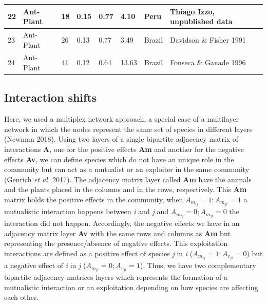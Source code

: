 \documentclass[a4paper, 12pt]{article}
\begin{document}
\begin{table}[H]
\begin{adjustbox}{width=\columnwidth,center}
{\begin{tabular}{|l|l|l|l|l|l|l|l|}
22                                 & Ant-Plant                          & 18                              & 0.15                            & 0.77                            & 4.10                               & Peru                                   & Thiago Izzo, unpublished data                   \\ \hline
23                                 & Ant-Plant                          & 26                              & 0.13                            & 0.77                            & 3.49                               & Brazil                                 & Davidson \& Fisher 1991                         \\ \hline
24                                 & Ant-Plant                          & 41                              & 0.12                            & 0.64                            & 13.63                              & Brazil                                 & Fonseca \& Ganade 1996                          \\ \hline
\end{tabular}}
\end{adjustbox}
\end{table}

\subsection*{Interaction shifts}
Here, we used a multiplex network approach, a special case of a multilayer network in which the nodes represent the same set of species in different layers (Newman 2018). Using two layers of a single bipartite adjacency matrix of interactions \textbf{A}, one for the positive effects \textbf{Am} and another for the negative effects \textbf{Av}, we can define species which do not have an unique role in the community but can act as a mutualist or an exploiter in the same community (Genrich \textit{et al.} 2017). The adjacency matrix layer called \textbf{Am} have the animals and the plants placed in the columns and in the rows, respectively. This \textbf{Am} matrix holds the positive effects in the community, when $A_{m_{ij}} = 1; A_{m_{ji}} = 1$ a mutualistic interaction happens between \textit{i} and \textit{j} and $A_{m_{ij}} = 0; A_{m_{ji}} = 0$ the interaction did not happen. Accordingly, the negative effects we have in an adjacency matrix layer \textbf{Av} with the same rows and columns as \textbf{Am} but representing the presence/absence of negative effects. This exploitation interactions are defined as a positive effect of species \textit{j} in \textit{i} ($A_{m_{ij}} = 1; A_{v_{ji}} = 0$) but a negative effect of \textit{i} in \textit{j}  ($A_{m_{ji}} = 0; A_{v_{ji}} = 1$). Thus, we have two complementary bipartite adjacency matrices layers which represents the formation of a mutualistic interaction or an exploitation depending on how species are affecting each other.
\end{document}
